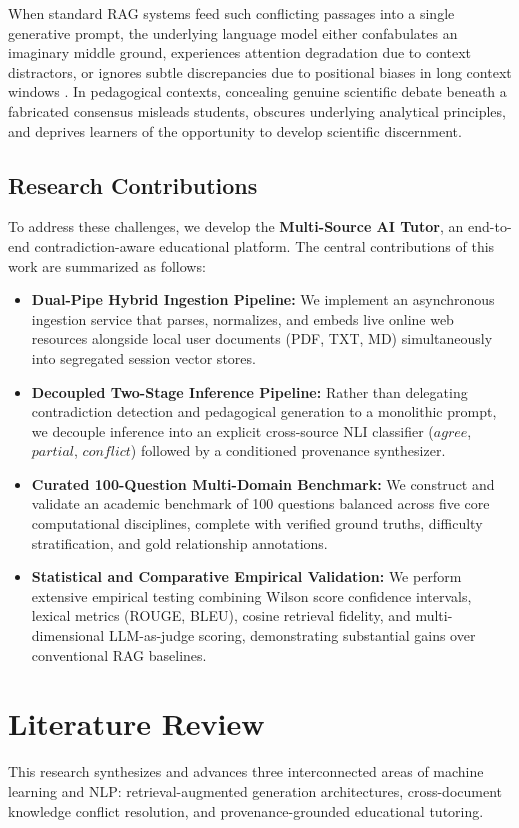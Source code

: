 \documentclass[conference]{IEEEtran}
\begin{document}
When standard RAG systems feed such conflicting passages into a single generative prompt, the underlying language model either confabulates an imaginary middle ground, experiences attention degradation due to context distractors, or ignores subtle discrepancies due to positional biases in long context windows \cite{liu2024lost}. In pedagogical contexts, concealing genuine scientific debate beneath a fabricated consensus misleads students, obscures underlying analytical principles, and deprives learners of the opportunity to develop scientific discernment.

\subsection{Research Contributions}
To address these challenges, we develop the \textbf{Multi-Source AI Tutor}, an end-to-end contradiction-aware educational platform. The central contributions of this work are summarized as follows:
\begin{itemize}
    \item \textbf{Dual-Pipe Hybrid Ingestion Pipeline:} We implement an asynchronous ingestion service that parses, normalizes, and embeds live online web resources alongside local user documents (PDF, TXT, MD) simultaneously into segregated session vector stores.
    \item \textbf{Decoupled Two-Stage Inference Pipeline:} Rather than delegating contradiction detection and pedagogical generation to a monolithic prompt, we decouple inference into an explicit cross-source NLI classifier ($\textit{agree}$, $\textit{partial}$, $\textit{conflict}$) followed by a conditioned provenance synthesizer.
    \item \textbf{Curated 100-Question Multi-Domain Benchmark:} We construct and validate an academic benchmark of 100 questions balanced across five core computational disciplines, complete with verified ground truths, difficulty stratification, and gold relationship annotations.
    \item \textbf{Statistical and Comparative Empirical Validation:} We perform extensive empirical testing combining Wilson score confidence intervals, lexical metrics (ROUGE, BLEU), cosine retrieval fidelity, and multi-dimensional LLM-as-judge scoring, demonstrating substantial gains over conventional RAG baselines.
\end{itemize}

\section{Literature Review}
\label{sec:lit}
This research synthesizes and advances three interconnected areas of machine learning and NLP: retrieval-augmented generation architectures, cross-document knowledge conflict resolution, and provenance-grounded educational tutoring.
\end{document}
